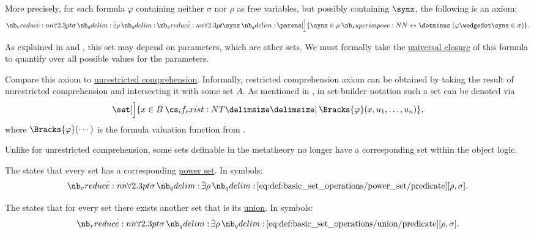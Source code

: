 \begin{definition}
\begin{thmenum}
    More precisely, for each formula \( \varphi \) containing neither \( \sigma \) nor \( \rho \) as free variables, but possibly containing \( \synx \), the following is an axiom:
    \begin{equation}\label{eq:def:zfc/specification}
      \qforall \sigma \qexists \rho \qforall \synx \parens[\Big]{ \synx \in \rho \syniff (\varphi \synwedge \synx \in \sigma) }.
    \end{equation}

    As explained in  and , this set may depend on parameters, which are other sets. We must formally take the \hyperref[def:universal_closure]{universal closure} of this formula to quantify over all possible values for the parameters.

    Compare this axiom to \hyperref[def:naive_set_theory/unrestricted_comprehension]{unrestricted comprehension}. Informally, restricted comprehension axiom can be obtained by taking the result of unrestricted comprehension and intersecting it with some set \( A \). As mentioned in , in set-builder notation such a set can be denoted via
    \begin{equation*}
      \set[\Big]{ x \in B \given* \Bracks{\varphi}(x, u_1, \ldots, u_n) },
    \end{equation*}
    where \( \Bracks{\varphi}(\cdots) \) is the formula valuation function from .

    Unlike for unrestricted comprehension, some sets definable in the metatheory no longer have a corresponding set within the object logic.

     The  states that every set has a corresponding \hyperref[def:basic_set_operations/power_set]{power set}. In symbols:
    \begin{equation}\label{eq:def:zfc/power_set}
      \qforall \sigma \qexists \rho \ref{eq:def:basic_set_operations/power_set/predicate}[\rho, \sigma].
    \end{equation}

     The  states that for every set there exists another set that is its \hyperref[def:basic_set_operations/union]{union}. In symbols:
    \begin{equation}\label{eq:def:zfc/union}
      \qforall \sigma \qexists \rho \ref{eq:def:basic_set_operations/union/predicate}[\rho, \sigma].
    \end{equation}


\end{thmenum}
\end{definition}
